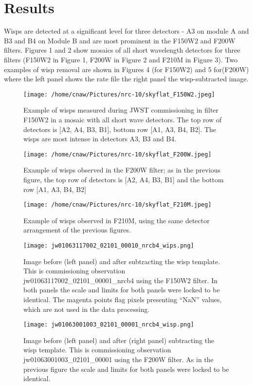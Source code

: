 \documentclass[12pt]{article}
\begin{document}
\section{Results}

Wisps are detected at a significant level for three detectors - A3 on
module A and B3 and B4 on Module B and are most prominent in the
F150W2 and F200W filters. Figures 1 and 2 show mosaics of all short
wavelength detectors for three filters (F150W2 in Figure 1, F200W in
Figure 2 and F210M in Figure 3). Two examples of wisp removal are shown
in Figures 4 (for F150W2) and 5 for(F200W) where the left panel shows
the rate file the right panel the wisp-subtracted image.

\begin{figure}
\texttt{[image: /home/cnaw/Pictures/nrc-10/skyflat\_F150W2.jpeg]}
  \caption{Example of wisps measured during JWST commissioning in
    filter F150W2 in a mosaic with all short wave detectors. The top row
    of detectors is [A2, A4, B3, B1], bottom row [A1, A3, B4, B2]. The
    wisps are most intense in detectors A3, B3 and B4.}
\end{figure}

\begin{figure}
  \texttt{[image: /home/cnaw/Pictures/nrc-10/skyflat\_F200W.jpeg]}
  \caption{Example of wisps observed in the F200W filter; as in the
    previous figure, the top row of detectors is [A2, A4, B3, B1] and the
    bottom row [A1, A3, B4, B2]} 
\end{figure}
\begin{figure}
  \texttt{[image: /home/cnaw/Pictures/nrc-10/skyflat\_F210M.jpeg]}
  \caption{Example of wisps observed in F210M, using the same detector
  arrangement of the previous figures.}
\end{figure}
\begin{figure}
  \centering
  \texttt{[image: jw01063117002\_02101\_00010\_nrcb4\_wips.png]}
  \caption{Image before (left panel) and after subtracting
    the wisp template. This is commissioning observation
    jw01063117002\_02101\_00001\_nrcb4 using the F150W2 filter. In
    both panels the scale and limits for both panels were locked to be
    identical. The magenta points flag pixels presenting ``NaN''
    values, which are not used in the data processing.}
\end{figure}
\begin{figure}
\centering
  \texttt{[image: jw01063001003\_02101\_00001\_nrcb4\_wisp.png]}
  \caption{Image before (left panel) and after (right
    panel) subtracting the wisp template. This is commissioning observation
    jw01063001003\_02101\_00001 using the F200W filter. As in the
    previous figure the scale and limits for both panels were locked to be
    identical.} 
\end{figure}
\end{document}
